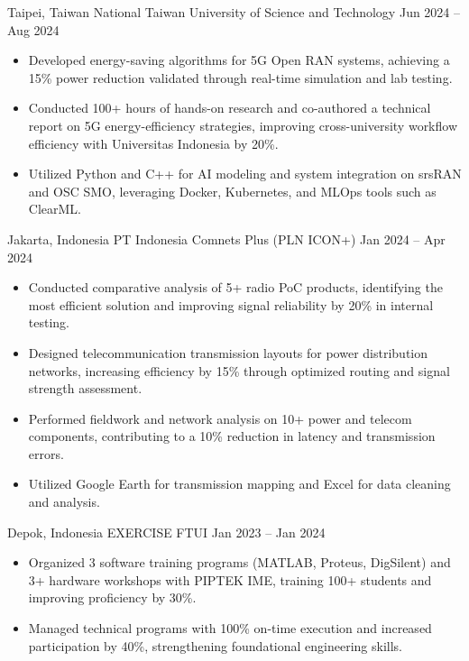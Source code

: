 {Taipei, Taiwan}
{National Taiwan University of Science and Technology}
{Jun 2024 -- Aug 2024}
{
\begin{itemize}
    \itemsep0em
    \item Developed energy-saving algorithms for 5G Open RAN systems, achieving a 15\% power reduction validated through real-time simulation and lab testing.
    \item Conducted 100+ hours of hands-on research and co-authored a technical report on 5G energy-efficiency strategies, improving cross-university workflow efficiency with Universitas Indonesia by 20\%.
    \item Utilized Python and C++ for AI modeling and system integration on srsRAN and OSC SMO, leveraging Docker, Kubernetes, and MLOps tools such as ClearML.
\end{itemize}
}

{Jakarta, Indonesia}
{PT Indonesia Comnets Plus (PLN ICON+)}
{Jan 2024 -- Apr 2024}
{
\begin{itemize}
    \itemsep0em
    \item Conducted comparative analysis of 5+ radio PoC products, identifying the most efficient solution and improving signal reliability by 20\% in internal testing.
    \item Designed telecommunication transmission layouts for power distribution networks, increasing efficiency by 15\% through optimized routing and signal strength assessment.
    \item Performed fieldwork and network analysis on 10+ power and telecom components, contributing to a 10\% reduction in latency and transmission errors.
    \item Utilized Google Earth for transmission mapping and Excel for data cleaning and analysis.
\end{itemize}
}

{Depok, Indonesia}
{EXERCISE FTUI}
{Jan 2023 -- Jan 2024}
{
\begin{itemize}
    \itemsep0em
    \item Organized 3 software training programs (MATLAB, Proteus, DigSilent) and 3+ hardware workshops with PIPTEK IME, training 100+ students and improving proficiency by 30\%.
    \item Managed technical programs with 100\% on-time execution and increased participation by 40\%, strengthening foundational engineering skills.
\end{itemize}
}
